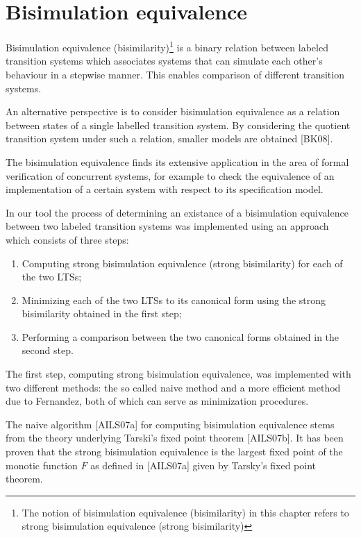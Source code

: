 \section{Bisimulation equivalence}
Bisimulation equivalence (bisimilarity)\footnote{The notion of bisimulation equivalence (bisimilarity) in this chapter 
refers to strong bisimulation equivalence (strong bisimilarity)} is a binary relation between labeled transition systems 
which associates systems that can simulate each other's behaviour in a stepwise manner. This enables comparison of 
different transition systems.

An alternative perspective is to consider bisimulation equivalence as a relation between states of a single labelled 
transition system. By considering the quotient transition system under such a relation, smaller models are obtained
[BK08].

The bisimulation equivalence finds its extensive application in the area of formal verification of concurrent systems,
for example to check the equivalence of an implementation of a certain system with respect to its specification model.

In our tool the process of determining an existance of a bisimulation equivalence 
between two labeled transition systems was implemented using an approach which consists of three steps:

\begin{enumerate}
\item Computing strong bisimulation equivalence (strong bisimilarity) for each of the two LTSs;
\item Minimizing each of the two LTSs to its canonical form using the strong bisimilarity obtained
in the first step;
\item Performing a comparison between the two canonical forms obtained in the second step.
\end{enumerate}

The first step, computing strong bisimulation equivalence, was implemented with two different methods: the so called
naive method and a more efficient method due to Fernandez, both of which can serve as minimization procedures.

The naive algorithm [AILS07a] for computing bisimulation equivalence stems from the theory underlying Tarski's fixed point
theorem [AILS07b]. It has been proven that the strong bisimulation equivalence is the largest fixed point of the 
monotic function $F$ as defined in [AILS07a] given by Tarsky's fixed point theorem. 

